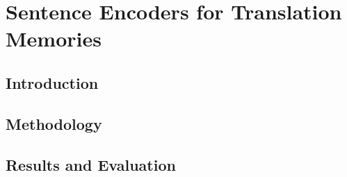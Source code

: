 \chapter{\label{cha:sentence_encoders}Sentence Encoders for Translation Memories}

\section{Introduction}
\cite{ranasinghe-etal-2020-intelligent}

\section{Methodology}

\section{Results and Evaluation}